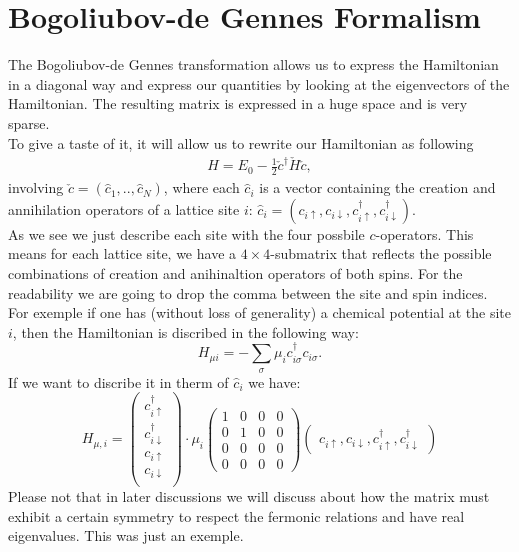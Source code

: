 \documentclass[../main.tex]{subfile}
\begin{document}
\section{Bogoliubov-de Gennes Formalism} \label{sec:BdGFormalism}
The Bogoliubov-de Gennes transformation allows us to express the Hamiltonian in a diagonal way and express our quantities 
by looking at the eigenvectors of the Hamiltonian. The resulting matrix is expressed in a huge space and is very sparse.\\

To give a taste of it, it will allow us to rewrite our Hamiltonian as following
\begin{align}
    H = E_0 - \frac{1}{2} \check{c}^\dagger \check{H} \check{c}, \label{eq:BdG_intro_H}
\end{align}
involving $\check{c} = (\hat{c}_1,..,\hat{c}_N)$, where each $\hat{c}_i$ is a
 vector containing the creation and annihilation operators of a lattice site $i$:
$\hat{c}_i = (c_{i\uparrow} ,c_{i\downarrow}, c_{i\uparrow}^{\dagger} ,c_{i\downarrow}^{\dagger})$.\\

As we see we just describe each site with the four possbile $c$-operators. This means for each lattice site,
we have a $4\times4$-submatrix that reflects the possible combinations of creation and anihinaltion operators of both spins. 
For the readability we are going to drop the comma between the site and spin indices.\\
For exemple if one has (without loss of generality) a chemical potential at the site $i$, 
 then the Hamiltonian is discribed in the following way:
\[
    H_{\mu i} = -\sum_{\sigma} \mu_i c_{i\sigma}^{\dagger} c_{i\sigma}.
\]
If we want to discribe it in therm of $\hat{c}_i$ we have:
\[
    H_{\mu,i} = \begin{pmatrix}
        c_{i\uparrow}^{\dagger} \\c_{i\downarrow}^{\dagger}\\ c_{i\uparrow} \\c_{i\downarrow}\\
    \end{pmatrix}\cdot \mu_i
     \begin{pmatrix}
        1 & 0 & 0 & 0\\
        0 & 1 & 0 & 0\\
        0 & 0 & 0 & 0\\
        0 & 0 & 0 & 0
    \end{pmatrix}\begin{pmatrix}c_{i\uparrow} ,c_{i\downarrow}, c_{i\uparrow}^{\dagger} ,c_{i\downarrow}^{\dagger}\end{pmatrix}
\]
Please not that in later discussions we will discuss about how the matrix must exhibit a certain symmetry to respect the fermonic relations and have 
real eigenvalues. This was just an exemple.\\
\end{document}
